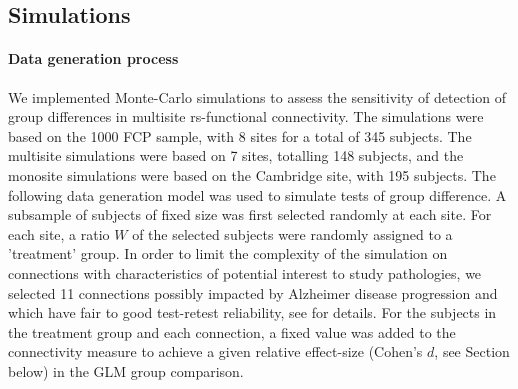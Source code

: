 \documentclass[authoryear]{elsarticle}
\begin{document}
\subsection{Simulations}

\paragraph{Data generation process}

We implemented Monte-Carlo simulations to assess the sensitivity of detection of group differences in multisite rs-functional connectivity. The simulations were based on the 1000 FCP sample, with 8 sites for a total of 345 subjects. The multisite simulations were based on 7 sites, totalling 148 subjects, and the monosite simulations were based on the Cambridge site, with 195 subjects. The following data generation model was used to simulate tests of group difference. A subsample of subjects of fixed size was first selected randomly at each site. For each site, a ratio $W$ of the selected subjects were randomly assigned to a 'treatment' group. In order to limit the complexity of the simulation on connections with characteristics of potential interest to study pathologies, we selected 11 connections possibly impacted by Alzheimer disease progression and which have fair to good test-retest reliability, see \cite{Orban2015} for details. For the subjects in the treatment group and each connection, a fixed value was added to the connectivity measure to achieve a given relative effect-size (Cohen's $d$, see Section below) in the GLM group comparison. 

% 
% 

\end{document}
